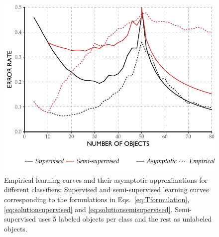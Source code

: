\documentclass[twoside]{memoir}\usepackage[]{graphicx}\usepackage{xcolor}
\makeatletter
\def\maxwidth{ %
  \ifdim\Gin@nat@width>\linewidth
    \linewidth
  \else
    \Gin@nat@width
  \fi
}
\newenvironment{knitrout}{}{} %
\makeatother
\begin{document}
\begin{knitrout}
\color{fgcolor}\begin{figure}
\includegraphics[width=\maxwidth]{figure/peaking-asymptotic-b-1} \caption{Empirical learning curves and their asymptotic approximations for different classifiers: Supervised and semi-supervised learning curves corresponding to the formulations in Eqs.~\eqref{eq:Tformulation}, \eqref{eq:solutionsupervised} and \eqref{eq:solutionsemisupervised}. Semi-supervised uses 5 labeled objects per class and the rest as unlabeled objects.}\label{fig:peaking-asymptotic-b}
\end{figure}


\end{knitrout}
\end{document}
